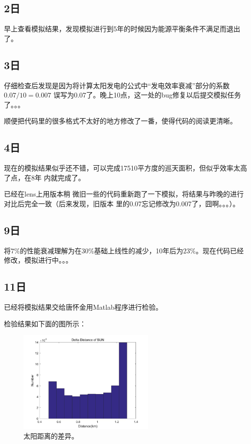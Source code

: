 \subsection{2日}
早上查看模拟结果，发现模拟进行到5年的时候因为能源平衡条件不满足而退出了。

\subsection{3日}
仔细检查后发现是因为将计算太阳发电的公式中“发电效率衰减”部分的系数$0.07/10=0.007$
误写为0.07了。晚上10点，这一处的bug修复以后提交模拟任务了。。。

顺便把代码里的很多格式不太好的地方修改了一番，使得代码的阅读更清晰。

\subsection{4日}
现在的模拟结果似乎还不错，可以完成17510平方度的巡天面积，但似乎效率太高了点，在8年
内就完成了。

\rm{} 已经在lens上用版本稍
微旧一些的代码重新跑了一下模拟，将结果与昨晚的进行对比后完全一致（后来发现，旧版本
里的0.07忘记修改为0.007了，囧啊。。。）。

\subsection{9日}
将$7\%$的性能衰减理解为在$30\%$基础上线性的减少，10年后为$23\%$。现在代码已经
修改，模拟进行中。。。


\subsection{11日}
已经将模拟结果交给唐怀金用Matlab程序进行检验。

检验结果如下面的图所示：

\begin{figure}
\centering
\includegraphics[width=0.6\textwidth]{figs/check_results/delta_distance_of_sun.png}
\caption{太阳距离的差异。}
\label{0411_check_results1}
\end{figure}

